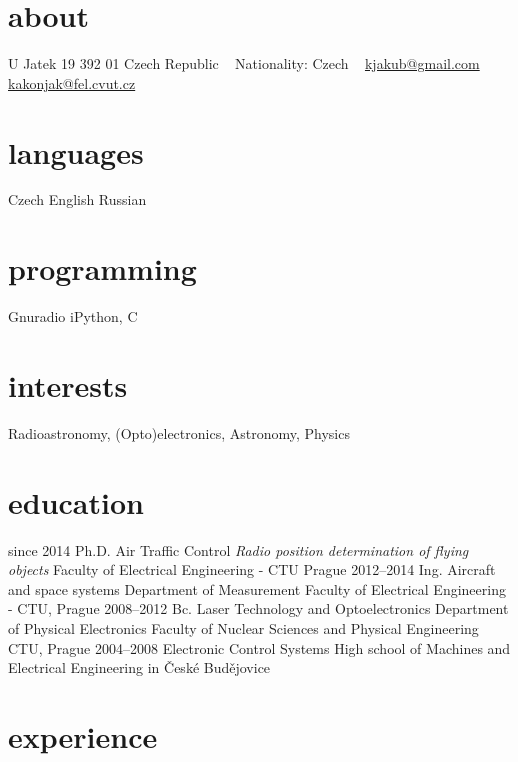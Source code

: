 \documentclass[]{friggeri-cv}
\begin{document}
       {}


\begin{aside}
  \section{about}
    U Jatek 19
    392 01
    Czech Republic
    ~
    Nationality:
    Czech
    ~
    \href{mailto:kjakub@gmail.com}{kjakub@gmail.com}
    \href{mailto:kakonjak@fel.cvut.cz}{kakonjak@fel.cvut.cz}    
  \section{languages}
    Czech
    English
    Russian
  \section{programming}
    Gnuradio
    iPython, C
\end{aside}

\section{interests}

Radioastronomy, (Opto)electronics, Astronomy, Physics 

\section{education}

\begin{entrylist}
  \entry
    {since 2014}
    {Ph.D. {\normalfont Air Traffic Control}}
    {\emph{Radio position determination of flying objects}}
    { Faculty of Electrical Engineering - CTU Prague}
  \entry
    {2012–2014}
    {Ing. Aircraft and space systems}
    {Department of Measurement}
    { Faculty of Electrical Engineering - CTU, Prague}
  \entry
    {2008–2012}
    {Bc. Laser Technology and Optoelectronics}
    {Department of Physical Electronics}
    {Faculty of Nuclear Sciences and Physical Engineering CTU, Prague}
  \entry
    {2004–2008}
    {Electronic Control Systems}
    {}
    {High school of Machines and Electrical Engineering in České Budějovice}
\end{entrylist}

\section{experience}
\end{document}

